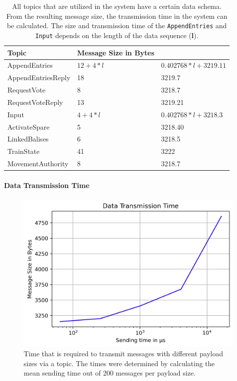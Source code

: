 \begin{table}[h!]
	\begin{center}
		\caption{All topics that are utilized in the system have a certain data schema. From the resulting message size, the transmission time in the system can be calculated. The size and transmission time of the \texttt{AppendEntries} and \texttt{Input} depends on the length of the data sequence (\textbf{l}).}
		\label{tab:topicSendingTimes}
		\begin{tabularx}{\textwidth}{|X|X|}
			\hline
			\textbf{Topic} & \textbf{Message Size in Bytes} \\
			\hline \hline
			AppendEntries & $12 + 4 * l$ & $0.402768 * l + 3219.11$ \\
			\hline
			AppendEntriesReply & 18 & 3219.7 \\
			\hline
			RequestVote & 8 & 3218.7 \\
			\hline
			RequestVoteReply & 13 & 3219.21 \\
			\hline
			Input & $4 + 4 * l$ & $0.402768 * l + 3218.3$ \\
			\hline
			ActivateSpare & 5 & 3218.40 \\
			\hline
			LinkedBalises & 6 & 3218.5 \\
			\hline
			TrainState & 41 & 3222 \\
			\hline
			MovementAuthority & 8 & 3218.7 \\
			\hline
		\end{tabularx}
	\end{center}
\end{table}


\paragraph{Data Transmission Time}
\begin{figure}[!htb]
	\centering
	\includegraphics[width=0.75\linewidth]{images/plots/sendingTimes}
	\caption{Time that is required to transmit messages with different payload sizes via a  topic. The times were determined by calculating the mean sending time out of 200 messages per payload size.}
	\label{fig:PlotSendingTimes}
\end{figure}


